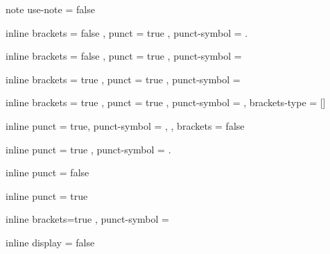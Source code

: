  {note}
  { use-note = false }

 {inline}
  {
    brackets     = false ,
    punct        = true ,
    punct-symbol = .
  }

 {inline}
  {
    brackets     = false ,
    punct        = true ,
    punct-symbol =
  }

 {inline}
  {
    brackets     = true ,
    punct        = true ,
    punct-symbol =
  }

 {inline}
  {
    brackets      = true ,
    punct         = true ,
    punct-symbol  = ,
    brackets-type = []
  }

 {inline}
  {
    punct         = true,
    punct-symbol  = {,} ,
    brackets      = false
  }

 {inline}
  {
    punct = true ,
    punct-symbol = .
  }
  
   {inline}
  { punct = false }

   {inline}
  { punct = true }

   {inline}
  {
    brackets=true ,
    punct-symbol = ~
  }

    {inline}
  { display = false }

